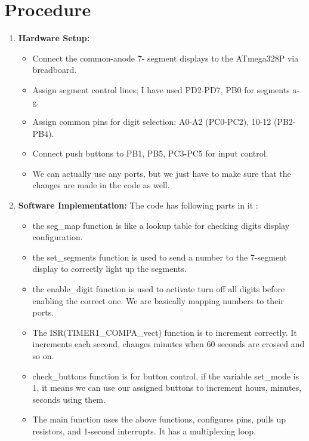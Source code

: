 \documentclass[journal]{IEEEtran}
\begin{document}
\section{Procedure}
\begin{enumerate}
    \item \textbf{Hardware Setup:}
    \begin{itemize}
        \item Connect the common-anode 7- segment displays to the ATmega328P via breadboard.
        \item Assign segment control lines; I have used PD2-PD7, PB0 for segments a-g.
        \item Assign common pins for digit selection: A0-A2 (PC0-PC2), 10-12 (PB2-PB4).
        \item Connect push buttons to PB1, PB5, PC3-PC5 for input control.
        \item We can actually use any ports, but we just have to make sure that the changes are made in the code as well.
    \end{itemize}
    \item \textbf{Software Implementation:}
    The code has following parts in it : 
    \begin{itemize}
        \item the seg\_map function is like a lookup table for checking digits display configuration.
        \item the set\_segments function is used to send a number to the 7-segment display to correctly light up the segments.
        \item the enable\_digit function is used to activate turn off all digits before enabling the correct one. We are basically mapping numbers to their ports.
        \item The ISR(TIMER1\_COMPA\_vect) function is to increment correctly. It increments each second, changes minutes when 60 seconds are crossed and so on.
        \item check\_buttons function is for button control, if the variable set\_mode is 1, it means we can use our assigned buttons to increment hours, minutes, seconds using them.
        \item The main function uses the above functions, configures pins, pulls up resistors, and 1-second interrupts. It has a multiplexing loop.
    \end{itemize}
\end{enumerate}
\end{document}
